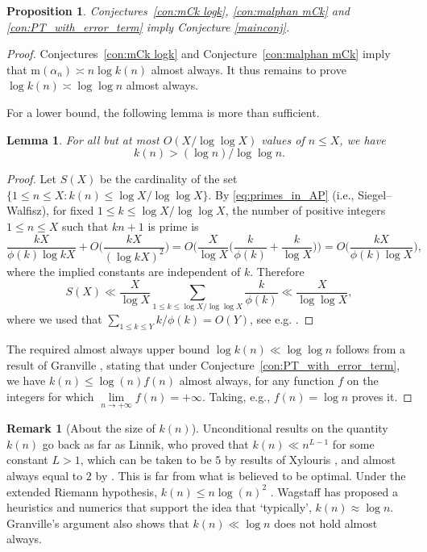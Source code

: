 \documentclass[12pt,reqno]{amsart}
\theoremstyle{definition}
\theoremstyle{plain}
\newtheorem{proposition}[theorem]{Proposition}
\newtheorem{lemma}[theorem]{Lemma}
\theoremstyle{definition}
\newtheorem{remark}[theorem]{Remark}
\newcommand\m{\mathrm{m}}
\renewcommand{\leq}{\leqslant}
\begin{document}
\begin{proposition}
\label{prop:conjs imply conj}
Conjectures~\ref{con:mCk logk}, \ref{con:malphan mCk} and \ref{con:PT_with_error_term} imply Conjecture \ref{mainconj}. 
\end{proposition}
\begin{proof}
Conjectures~\ref{con:mCk logk} and Conjecture~\ref{con:malphan mCk} imply that $\m(\alpha_n) \asymp n \log{k(n)}$ almost always. It thus remains to prove $\log{k(n)} \asymp \log{\log{n}}$ almost always. 

For a lower bound, the following lemma is more than sufficient. 

\begin{lemma} 
\label{lem:k(n) lower bound}
For all but at most $O(X/\log{\log{X}})$ values of $n \leq X$, we have $$k(n) > (\log{n})/\log{\log{n}}.$$
\end{lemma}
\begin{proof}
Let $S(X)$ be the cardinality of the set $\{1 \leq n \leq X : k(n) \leq \log{X}/\log{\log{X}}\}$. By \eqref{eq:primes_in_AP} (i.e., Siegel--Walfisz), for fixed $1 \leq k \leq \log{X}/\log{\log{X}}$, the number of positive integers $1 \leq n \leq X$ such that $kn+1$ is prime is 
\begin{equation*}
\frac{kX}{\phi(k) \log{kX}} + O \Big( \frac{kX}{(\log{kX})^2} \Big) = O \Big( \frac{X}{\log{X}} \Big( \frac{k}{\phi(k)} + \frac{k}{\log{X}} \Big)  \Big) = O\Big( \frac{kX}{\phi(k)\log{X}} \Big),
\end{equation*}
where the implied constants are independent of $k$. Therefore 
\begin{equation} \label{sx}
S(X) \ll \frac{X}{\log{X}} \sum_{1 \leq k \leq \log{X}/\log{\log{X}}} \frac{k}{\phi(k)} \ll \frac{X}{\log{\log{X}}},
\end{equation} 
where we used that $\sum_{1\leq k \leq Y} k/\phi(k) = O(Y)$, see e.g. \cite[Equation (2.12)]{Sitaramachandra}.
\end{proof}

The required almost always upper bound $\log{k(n)} \ll \log{\log{n}}$ follows from a result of Granville \cite[Theorem 4]{Granville}, stating that under Conjecture~\ref{con:PT_with_error_term}, we have $k(n) \leq \log(n) f(n)$ almost always, for any function $f$ on the integers for which $\lim\limits_{n \rightarrow + \infty} f(n) = + \infty.$ Taking, e.g., $f(n) = \log{n}$ proves it. 
\end{proof}


\begin{remark}[About the size of $k(n)$]
Unconditional results on the quantity $k(n)$ go back as far as Linnik, who proved that $k(n) \ll n^{L-1}$ for some constant $L>1$, which can be taken to be $5$ by results of Xylouris \cite{Xylouris}, and almost always equal to $2$ by \cite{Bombieri-et-al}. This is far from what is believed to be optimal. Under the extended Riemann hypothesis, $k(n) \leq n \log(n)^2$ \cite[Cor.~1.2]{LLS}. Wagstaff \cite{Wagstaff} has proposed a heuristics and numerics that support the idea that `typically', $k(n) \approx \log n$. Granville's argument also shows that $k(n) \ll \log n$ does not hold almost always.
\end{remark} 
\end{document}
